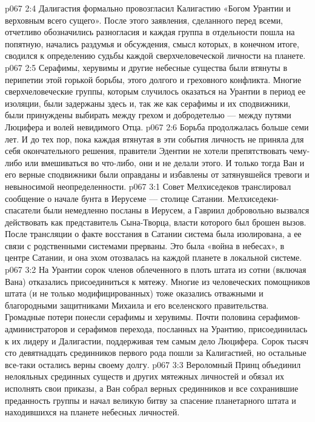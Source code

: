 \vs p067 2:4 \pc Далигастия формально провозгласил Калигастию «Богом Урантии и верховным всего сущего». После этого заявления, сделанного перед всеми, отчетливо обозначились разногласия и каждая группа в отдельности пошла на попятную, начались раздумья и обсуждения, смысл которых, в конечном итоге, сводился к определению судьбы каждой сверхчеловеческой личности на планете.
\vs p067 2:5 Серафимы, херувимы и другие небесные существа были втянуты в перипетии этой горькой борьбы, этого долгого и греховного конфликта. Многие сверхчеловеческие группы, которым случилось оказаться на Урантии в период ее изоляции, были задержаны здесь и, так же как серафимы и их сподвижники, были принуждены выбирать между грехом и добродетелью --- между путями Люцифера и волей невидимого Отца.
\vs p067 2:6 Борьба продолжалась больше семи лет. И до тех пор, пока каждая втянутая в эти события личность не приняла для себя окончательного решения, правители Эдентии не хотели препятствовать чему\hyp{}либо или вмешиваться во что\hyp{}либо, они и не делали этого. И только тогда Ван и его верные сподвижники были оправданы и избавлены от затянувшейся тревоги и невыносимой неопределенности.
\vs p067 3:1 Совет Мелхиседеков транслировал сообщение о начале бунта в Иерусеме --- столице Сатании. Мелхиседеки\hyp{}спасатели были немедленно посланы в Иерусем, а Гавриил добровольно вызвался действовать как представитель Сына\hyp{}Творца, власти которого был брошен вызов. После трансляции о факте восстания в Сатании система была изолирована, а ее связи с родственными системами прерваны. Это была «война в небесах», в центре Сатании, и она эхом отозвалась на каждой планете в локальной системе.
\vs p067 3:2 На Урантии сорок членов облеченного в плоть штата из сотни (включая Вана) отказались присоединиться к мятежу. Многие из человеческих помощников штата (и не только модифицированных) тоже оказались отважными и благородными защитниками Михаила и его вселенского правительства. Громадные потери понесли серафимы и херувимы. Почти половина серафимов\hyp{}администраторов и серафимов перехода, посланных на Урантию, присоединилась к их лидеру и Далигастии, поддерживая тем самым дело Люцифера. Сорок тысяч сто девятнадцать срединников первого рода пошли за Калигастией, но остальные все\hyp{}таки остались верны своему долгу.
\vs p067 3:3 Вероломный Принц объединил нелояльных срединных существ и других мятежных личностей и обязал их исполнять свои приказы, а Ван собрал верных срединников и все сохранившие преданность группы и начал великую битву за спасение планетарного штата и находившихся на планете небесных личностей.
